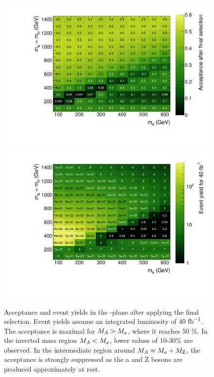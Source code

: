 \begin{figure}
\includegraphics[width=\textwidth]{texinputs/04_grid/figures/monoz/leptonic/acceptance_dmwg-final_26300.pdf}
\includegraphics[width=\textwidth]{texinputs/04_grid/figures/monoz/leptonic/xs_2d_dmwg-final_26300_yield40fb.pdf}
\caption{Acceptance and event yields in the  \ma-\mA plane after applying the final selection. Event yields assume an integrated luminosity of $40~\rm{fb}^{-1}$. The acceptance is maximal for $M_{A} > M_{a}$, where it reaches 50 \%. In the inverted mass region $M_{A} < M_{a}$, lower values of 10-30\% are observed. In the intermediate region around $M_{A} \approx M_{a} + M_{\rm{Z}}$, the acceptance is strongly suppressed as the a and Z bosons are produced approximately at rest.}
\label{fig:monoz_ll_acceptance}
\end{figure}

